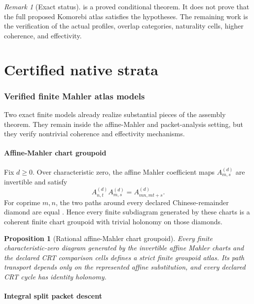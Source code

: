 \documentclass[11pt]{article}
\newtheorem{proposition}[theorem]{Proposition}
\theoremstyle{definition}
\theoremstyle{remark}
\newtheorem{remark}[theorem]{Remark}
\begin{document}
\begin{remark}[Exact status]
 is a proved conditional theorem. It does not prove that the full proposed Komorebi atlas satisfies the hypotheses. The remaining work is the verification of the actual profiles, overlap categories, naturality cells, higher coherence, and effectivity.
\end{remark}

\part{Certified native strata}

\section{Verified finite Mahler atlas models}

Two exact finite models already realize substantial pieces of the assembly theorem. They remain inside the affine-Mahler and packet-analysis setting, but they verify nontrivial coherence and effectivity mechanisms.

\subsection{Affine-Mahler chart groupoid}

Fix \(d\ge0\). Over characteristic zero, the affine Mahler coefficient maps \(A_{m,s}^{(d)}\) are invertible and satisfy
\[
A_{n,t}^{(d)}A_{m,s}^{(d)}=A_{mn,mt+s}^{(d)}.
\]
For coprime \(m,n\), the two paths around every declared Chinese-remainder diamond are equal \cite{CT4}. Hence every finite subdiagram generated by these charts is a coherent finite chart groupoid with trivial holonomy on those diamonds.

\begin{proposition}[Rational affine-Mahler chart groupoid]
Every finite characteristic-zero diagram generated by the invertible affine Mahler charts and the declared CRT comparison cells defines a strict finite groupoid atlas. Its path transport depends only on the represented affine substitution, and every declared CRT cycle has identity holonomy.
\end{proposition}

\subsection{Integral split packet descent}
\end{document}
